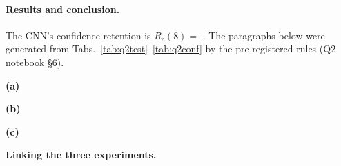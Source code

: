 \paragraph{Results and conclusion.} The CNN's confidence retention is $R_c(8)=$ . The paragraphs below
were generated from Tabs.~\ref{tab:q2test}--\ref{tab:q2conf} by the pre-registered rules (Q2 notebook \S6).

\noindent\textbf{(a)} 

\noindent\textbf{(b)} 

\noindent\textbf{(c)}  

\noindent\textbf{Linking the three experiments.} 
